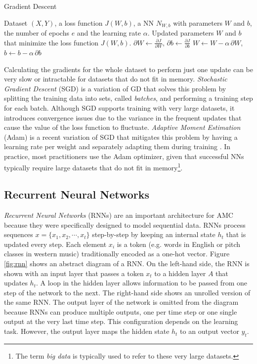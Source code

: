 \begin{algorithm}[t]
\caption{Gradient Descent}
\label{alg:grad_desc}
\begin{algorithmic}[1]
\REQUIRE Dataset $(X, Y)$, a loss function $J(W,b)$, a NN $N_{W,b}$ with
parameters $W$ and $b$, the number of epochs $e$ and the learning rate $\alpha$.
\ENSURE Updated parameters $W$ and $b$ that minimize the loss function $J(W,b)$.
       \STATE $\partial W \gets \frac{\partial J}{\partial W}$, $\partial b \gets \frac{\partial J}{\partial b}$ \label{line:grad}
       \STATE $W \gets W - \alpha \, \partial W$, $b \gets b - \alpha \, \partial b$ \label{line:update}
\ENDFOR
\end{algorithmic}
\end{algorithm}

Calculating the gradients for the whole dataset to perform just one update can be very slow or intractable for datasets that do not fit in memory. \textit{Stochastic Gradient Descent} (SGD) is a variation of GD that solves this problem by splitting the training data into sets, called \textit{batches}, and performing a training step for each batch. Although SGD supports training with very large datasets, it introduces convergence issues due to the variance in the frequent updates that cause the value of the loss function to fluctuate. \textit{Adaptive Moment Estimation} (Adam) is a recent variation of SGD that mitigates this problem by having a learning rate per weight and separately adapting them during training \cite{kingma2014adam}. In practice, most practitioners use the Adam optimizer, given that successful NNs typically require large datasets that do not fit in memory\footnote{The term \textit{big data} is typically used to refer to these very large datasets.}.

\subsection{Recurrent Neural Networks}
\label{sec:rnns}

\textit{Recurrent Neural Networks} (RNNs) are an important architecture for AMC because they were specifically designed to model sequential data. RNNs process sequences $x = \{x_1, x_2, \cdots, x_t\}$ step-by-step by keeping an internal state $h_t$ that is updated every step. Each element $x_i$ is a token (e.g. words in English or pitch classes in western music) traditionally encoded as a one-hot vector. Figure \ref{fig:rnn} shows an abstract diagram of a RNN. On the left-hand side, the RNN is shown with an input layer that passes a token $x_t$ to a hidden layer $A$ that updates $h_t$. A loop in the hidden layer allows information to be passed from one step of the network to the next. The right-hand side shows an unrolled version of the same RNN. The output layer of the network is omitted from the diagram because RNNs can produce multiple outputs, one per time step or one single output at the very last time step. This configuration depends on the learning task. However, the output layer maps the hidden state $h_t$ to an output vector $y_t$.

